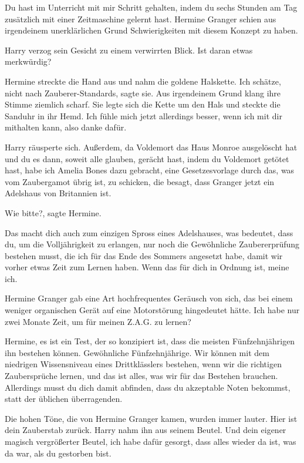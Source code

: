\glqq{}Du hast im Unterricht mit mir Schritt gehalten, indem du sechs Stunden am
Tag zusätzlich mit einer Zeitmaschine gelernt hast.\grqq{} Hermine Granger schien aus
irgendeinem unerklärlichen Grund Schwierigkeiten mit diesem Konzept zu haben.

Harry verzog sein Gesicht zu einem verwirrten Blick. \glqq{}Ist daran etwas
merkwürdig?\grqq{}

Hermine streckte die Hand aus und nahm die goldene Halskette. \glqq{}Ich schätze,
nicht nach Zauberer-Standards\grqq{}, sagte sie. Aus irgendeinem Grund klang
ihre Stimme ziemlich scharf. Sie legte sich die Kette um den Hals und steckte
die Sanduhr in ihr Hemd. \glqq{}Ich fühle mich jetzt allerdings besser, wenn ich
mit dir mithalten kann, also danke dafür.\grqq{}

Harry räusperte sich. \glqq{}Außerdem, da Voldemort das Haus Monroe ausgelöscht
hat und du es dann, soweit alle glauben, gerächt hast, indem du Voldemort
getötet hast, habe ich Amelia Bones dazu gebracht, eine Gesetzesvorlage durch
das, was vom Zaubergamot übrig ist, zu schicken, die besagt, dass Granger jetzt
ein Adelshaus von Britannien ist.\grqq{}

\glqq{}Wie bitte?\grqq{}, sagte Hermine.

\glqq{}Das macht dich auch zum einzigen Spross eines Adelshauses, was bedeutet,
dass du, um die Volljährigkeit zu erlangen, nur noch die Gewöhnliche
Zaubererprüfung bestehen musst, die ich für das Ende des Sommers angesetzt habe,
damit wir vorher etwas Zeit zum Lernen haben. Wenn das für dich in Ordnung ist,
meine ich.\grqq{}

Hermine Granger gab eine Art hochfrequentes Geräusch von sich, das bei einem
weniger organischen Gerät auf eine Motorstörung hingedeutet hätte. \glqq{}Ich
habe nur zwei Monate Zeit, um für meinen Z.A.G. zu lernen?\grqq{}

\glqq{}Hermine, es ist ein Test, der so konzipiert ist, dass die meisten
Fünfzehnjährigen ihn bestehen können. Gewöhnliche Fünfzehnjährige. Wir können
mit dem niedrigen Wissensniveau eines Drittklässlers bestehen, wenn wir die
richtigen Zaubersprüche lernen, und das ist alles, was wir für das Bestehen
brauchen. Allerdings musst du dich damit abfinden, dass du akzeptable Noten
bekommst, statt der üblichen überragenden.\grqq{}

Die hohen Töne, die von Hermine Granger kamen, wurden immer lauter. \glqq{}Hier
ist dein Zauberstab zurück.\grqq{} Harry nahm ihn aus seinem Beutel. \glqq{}Und dein
eigener magisch vergrößerter Beutel, ich habe dafür gesorgt, dass alles wieder
da ist, was da war, als du gestorben bist.\grqq{}

